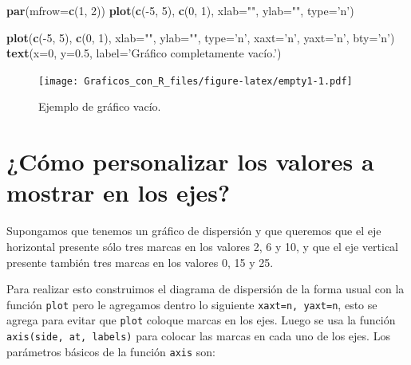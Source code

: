 \documentclass[10pt,]{krantz}
\makeatletter
\newenvironment{Shaded}{\begin{snugshade}}{\end{snugshade}}
\newcommand{\KeywordTok}[1]{\textcolor[rgb]{0.13,0.29,0.53}{\textbf{{#1}}}}
\newcommand{\DataTypeTok}[1]{\textcolor[rgb]{0.13,0.29,0.53}{{#1}}}
\newcommand{\DecValTok}[1]{\textcolor[rgb]{0.00,0.00,0.81}{{#1}}}
\newcommand{\FloatTok}[1]{\textcolor[rgb]{0.00,0.00,0.81}{{#1}}}
\newcommand{\StringTok}[1]{\textcolor[rgb]{0.31,0.60,0.02}{{#1}}}
\newcommand{\NormalTok}[1]{{#1}}
\newenvironment{kframe}{%
\medskip{}
\setlength{\fboxsep}{.8em}
 \def\at@end@of@kframe{}%
 \ifinner\ifhmode%
  \def\at@end@of@kframe{\end{minipage}}%
  \begin{minipage}{\columnwidth}%
 \fi\fi%
 \def\FrameCommand##1{\hskip\@totalleftmargin \hskip-\fboxsep
 \colorbox{shadecolor}{##1}\hskip-\fboxsep
     \hskip-\linewidth \hskip-\@totalleftmargin \hskip\columnwidth}%
 \MakeFramed {\advance\hsize-\width
   \@totalleftmargin\z@ \linewidth\hsize
   \@setminipage}}%
 {\par\unskip\endMakeFramed%
 \at@end@of@kframe}
\renewenvironment{Shaded}{\begin{kframe}}{\end{kframe}}
\makeatother
\begin{document}
\begin{Shaded}
\begin{Highlighting}[]
\KeywordTok{par}\NormalTok{(}\DataTypeTok{mfrow=}\KeywordTok{c}\NormalTok{(}\DecValTok{1}\NormalTok{, }\DecValTok{2}\NormalTok{))}
\KeywordTok{plot}\NormalTok{(}\KeywordTok{c}\NormalTok{(-}\DecValTok{5}\NormalTok{, }\DecValTok{5}\NormalTok{), }\KeywordTok{c}\NormalTok{(}\DecValTok{0}\NormalTok{, }\DecValTok{1}\NormalTok{), }\DataTypeTok{xlab=}\StringTok{""}\NormalTok{, }\DataTypeTok{ylab=}\StringTok{""}\NormalTok{, }\DataTypeTok{type=}\StringTok{'n'}\NormalTok{)}

\KeywordTok{plot}\NormalTok{(}\KeywordTok{c}\NormalTok{(-}\DecValTok{5}\NormalTok{, }\DecValTok{5}\NormalTok{), }\KeywordTok{c}\NormalTok{(}\DecValTok{0}\NormalTok{, }\DecValTok{1}\NormalTok{), }\DataTypeTok{xlab=}\StringTok{""}\NormalTok{, }\DataTypeTok{ylab=}\StringTok{""}\NormalTok{, }\DataTypeTok{type=}\StringTok{'n'}\NormalTok{,}
     \DataTypeTok{xaxt=}\StringTok{'n'}\NormalTok{, }\DataTypeTok{yaxt=}\StringTok{'n'}\NormalTok{, }\DataTypeTok{bty=}\StringTok{'n'}\NormalTok{)}
\KeywordTok{text}\NormalTok{(}\DataTypeTok{x=}\DecValTok{0}\NormalTok{, }\DataTypeTok{y=}\FloatTok{0.5}\NormalTok{,}
     \DataTypeTok{label=}\StringTok{'Gráfico completamente vacío.'}\NormalTok{)}
\end{Highlighting}
\end{Shaded}

\begin{figure}[htbp]
\centering
\texttt{[image: Graficos\_con\_R\_files/figure-latex/empty1-1.pdf]}
\caption{\label{fig:empty1}Ejemplo de gráfico vacío.}
\end{figure}

\section{¿Cómo personalizar los valores a mostrar en los
ejes?}\label{como-personalizar-los-valores-a-mostrar-en-los-ejes}

Supongamos que tenemos un gráfico de dispersión y que queremos que el
eje horizontal presente sólo tres marcas en los valores 2, 6 y 10, y que
el eje vertical presente también tres marcas en los valores 0, 15 y 25.

Para realizar esto construimos el diagrama de dispersión de la forma
usual con la función \texttt{plot} pero le agregamos dentro lo siguiente
\texttt{xaxt=\textquotesingle{}n\textquotesingle{},\ yaxt=\textquotesingle{}n\textquotesingle{}},
esto se agrega para evitar que \texttt{plot} coloque marcas en los ejes.
Luego se usa la función \texttt{axis(side,\ at,\ labels)} para colocar
las marcas en cada uno de los ejes. Los parámetros básicos de la función
\texttt{axis} son:
\end{document}
